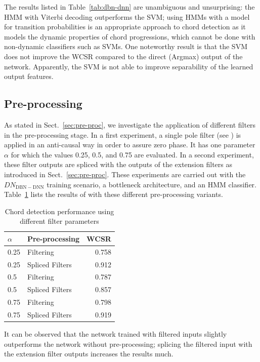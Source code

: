 \documentclass{article}
\begin{document}
The results listed in Table~\ref{tab:dbn-dnn} are unambiguous and unsurprising: the HMM with Viterbi decoding outperforms the SVM; using HMMs with a model for transition probabilities is an appropriate approach to chord detection as it models the dynamic properties of chord progressions, which cannot be done with non-dynamic classifiers such as SVMs. One noteworthy result is that the SVM does not improve the WCSR compared to the direct (Argmax) output of the network. Apparently, the SVM is not able to improve separability of the learned output features.
\subsection{Pre-processing}
As stated in Sect.~\ref{sec:pre-proc}, we investigate the application of different filters in the pre-processing stage. 
In a first experiment, a single pole filter (see ) is applied in an anti-causal way in order to assure zero phase. It has one parameter $\alpha$ for which the values 0.25, 0.5, and 0.75 are evaluated. In a second experiment, these filter outputs are spliced with the outputs of the extension filters as introduced in Sect.~\ref{sec:pre-proc}. These experiments are carried out with the  $DN_\mathrm{DBN-DNN}$ training scenario, a bottleneck architecture, and an HMM classifier. Table~\ref{table:filter} lists the results of with these different pre-processing variants.
\begin{table}[h]
\begin{tabular*}{\columnwidth}{@{\extracolsep{\fill}}llr}
\toprule
$\alpha$    & Pre-processing  & WCSR  \\  \midrule
0.25 & Filtering             & 0.758 \\
0.25 & Spliced Filters & 0.912 \\
0.5  & Filtering             & 0.787 \\
0.5  & Spliced Filters & 0.857 \\
0.75 & Filtering             & 0.798 \\
0.75 & Spliced Filters & 0.919 \\ \bottomrule
\end{tabular*}
\caption{Chord detection performance using different filter parameters}


\label{table:filter}

\end{table}
It can be observed that the network trained with filtered inputs slightly outperforms the network without pre-processing; splicing the filtered input with the extension filter outputs increases the results much. 
\end{document}
